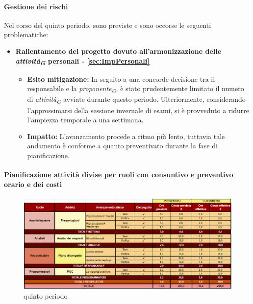 \paragraph{Gestione dei rischi} 
Nel corso del quinto periodo, sono previste e sono occorse le seguenti problematiche:
\begin{itemize}
    \item \textbf{Rallentamento del progetto dovuto all’armonizzazione delle \textit{attività}\textsubscript{\textit{G}} personali - \ref{sec:ImpPersonali}}
    \begin{itemize}
        \item \textbf{Esito mitigazione:} 
        In seguito a una concorde decisione tra il responsabile e la \textit{proponente}\textsubscript{\textit{G}}, è stato prudentemente limitato il numero di \textit{attività}\textsubscript{\textit{G}} avviate durante questo periodo. Ulteriormente, considerando l'approssimarsi della sessione invernale di esami, si è provveduto a ridurre l'ampiezza temporale a una settimana.
        \item \textbf{Impatto:}
        L'avanzamento procede a ritmo più lento, tuttavia tale andamento è conforme a quanto preventivato durante la fase di pianificazione.
    \end{itemize}
\end{itemize}
\newpage
\paragraph{Pianificazione attività divise per ruoli con consuntivo e preventivo orario e dei costi}\hspace{1pt}

\begin{figure}[H]
    \centering
    \includegraphics[width=\linewidth, height=0.9\textheight, keepaspectratio]{../Images/periodo5.PNG}
    \caption{quinto periodo}
    \label{fig:Quinto_periodo}
\end{figure}

